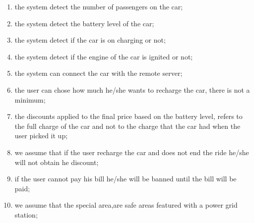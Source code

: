 \begin{enumerate}
	\item the system detect the number of passengers on the car;
	\item the system detect the battery level of the car;
	\item the system detect if the car is on charging or not;
	\item the system detect if the engine of the car is ignited or not;
	\item the system can connect the car with the remote server;
	\item the user can chose how much he/she wants to recharge the car, there is not a minimum;
	\item the discounts applied to the final price based on the battery level, refers to the full charge of the car and not to the charge that the car had when the user picked it up;
	\item we assume that if the user recharge the car and does not end the ride he/she will not obtain he discount;
	\item if the user cannot pay his bill he/she will be banned until the bill will be paid;
	\item we assume that the special area,are safe areas featured with a power grid station;
\end{enumerate}